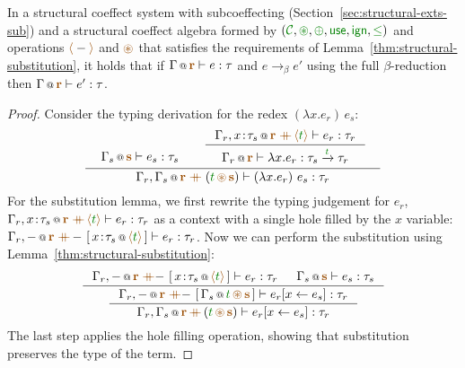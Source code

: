 \begin{theorem}
In a structural coeffect system with subcoeffecting (Section~\ref{sec:structural-exts-sub})
and a structural coeffect algebra formed by
$(\C, \cseq, \cpar, \cunit, \czero, \cleq)$ and operations $\alift{-}$ and $\aseq$ that
satisfies the requirements of Lemma~\ref{thm:structural-substitution},
it holds that if $\coctx{\Gamma}{\aclrd{\textbf{r}}} \vdash e : \tau$
and $e \rightarrow_{\beta} e'$ using the full $\beta$-reduction then
$\coctx{\Gamma}{\aclrd{\textbf{r}}} \vdash e' : \tau$.
\end{theorem}
\begin{proof}
Consider the typing derivation for the redex $(\lambda x.e_r)\,e_s$:
%
\begin{equation*}
\inference
  { \begin{array}{l}\coctx{\Gamma_s}{\aclrd{\textbf{s}}} \vdash e_s : \tau_s\vspace{-2em}\end{array} &
    \inference
      { \coctx{\Gamma_r, x\!:\!\tau_s}{\aclrd{\textbf{r}}\;\atimes\,\alift{\cclrd{t}}} \vdash e_r : \tau_r }
      { \coctx{\Gamma_r}{\aclrd{\textbf{r}}} \vdash \lambda x.e_r : \tau_s \xrightarrow{\cclrd{t}} \tau_r} \vspace{0.2em} }
  { \coctx{\Gamma_r, \Gamma_s}{\aclrd{\textbf{r}} \;\atimes\; (\cclrd{t} \,\aseq\, \aclrd{\textbf{s}})} \vdash (\lambda x.e_r)~e_s : \tau_r }
\end{equation*}
%
For the substitution lemma, we first rewrite the typing judgement for $e_r$, \ie~
$\coctx{\Gamma_r, x\!:\!\tau_s}{\aclrd{\textbf{r}}\;\atimes\,\alift{\cclrd{t}}} \vdash e_r : \tau_r$
as a context with a single hole filled by the $x$ variable:
$\coctx{\Gamma_r, -}{\aclrd{\textbf{r}}\;\atimes\,-}~[\,\coctx{x\!:\!\tau_s}{\alift{\cclrd{t}}}\,] \vdash e_r : \tau_r$.
Now we can perform the substitution using Lemma~\ref{thm:structural-substitution}:
%
\begin{equation*}
\inference
  { \coctx{\Gamma_r, -}{\aclrd{\textbf{r}}\;\atimes-}~[\,\coctx{x\!:\!\tau_s}{\alift{\cclrd{t}}}\,] \vdash e_r : \tau_r &
    \coctx{\Gamma_s}{\aclrd{\textbf{s}}} \vdash e_s : \tau_s }
  { \inference
      { \coctx{\Gamma_r, -}{\aclrd{\textbf{r}}\;\atimes-}~[\,\coctx{\Gamma_s}{\cclrd{t}\,\aseq\,\aclrd{\textbf{s}} }\,] \vdash \subst{e_r}{x}{e_s} : \tau_r }
      { \coctx{\Gamma_r, \Gamma_s}{\aclrd{\textbf{r}}\,\atimes\,(\cclrd{t}\,\aseq\,\aclrd{\textbf{s}})} \vdash \subst{e_r}{x}{e_s} : \tau_r } }
\end{equation*}
%
The last step applies the hole filling operation, showing that substitution preserves
the type of the term.
\end{proof}

